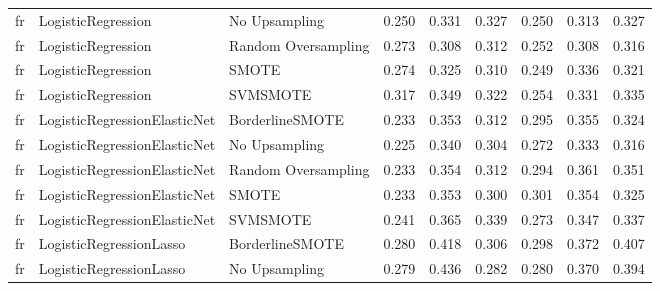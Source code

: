 \begin{tabular}{lllllllll}
      fr &              LogisticRegression &                 No Upsampling & 0.250 &                     0.331 &                 0.327 &                  0.250 &                                   0.313 &     0.327 \\
      fr &              LogisticRegression &           Random Oversampling & 0.273 &                     0.308 &                 0.312 &                  0.252 &                                   0.308 &     0.316 \\
      fr &              LogisticRegression &                         SMOTE & 0.274 &                     0.325 &                 0.310 &                  0.249 &                                   0.336 &     0.321 \\
      fr &              LogisticRegression &                      SVMSMOTE & 0.317 &                     0.349 &                 0.322 &                  0.254 &                                   0.331 &     0.335 \\
      fr &    LogisticRegressionElasticNet &               BorderlineSMOTE & 0.233 &                     0.353 &                 0.312 &                  0.295 &                                   0.355 &     0.324 \\
      fr &    LogisticRegressionElasticNet &                 No Upsampling & 0.225 &                     0.340 &                 0.304 &                  0.272 &                                   0.333 &     0.316 \\
      fr &    LogisticRegressionElasticNet &           Random Oversampling & 0.233 &                     0.354 &                 0.312 &                  0.294 &                                   0.361 &     0.351 \\
      fr &    LogisticRegressionElasticNet &                         SMOTE & 0.233 &                     0.353 &                 0.300 &                  0.301 &                                   0.354 &     0.325 \\
      fr &    LogisticRegressionElasticNet &                      SVMSMOTE & 0.241 &                     0.365 &                 0.339 &                  0.273 &                                   0.347 &     0.337 \\
      fr &         LogisticRegressionLasso &               BorderlineSMOTE & 0.280 &                     0.418 &                 0.306 &                  0.298 &                                   0.372 &     0.407 \\
      fr &         LogisticRegressionLasso &                 No Upsampling & 0.279 &                     0.436 &                 0.282 &                  0.280 &                                   0.370 &     0.394 \\

\end{tabular}
